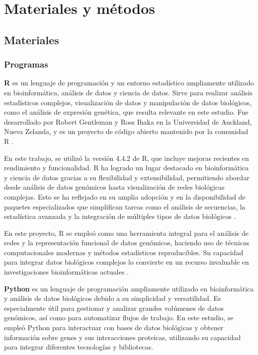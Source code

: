 \section{Materiales y métodos}


\subsection{\textbf{Materiales}}


\subsubsection{\textbf{Programas}}


\textbf{R} es un lenguaje de programación y un entorno estadístico ampliamente utilizado en bioinformática, análisis de datos y ciencia de datos. Sirve para realizar análisis estadísticos complejos, visualización de datos y manipulación de datos biológicos, como el análisis de expresión genética, que resulta relevante en este estudio. Fue desarrollado por Robert Gentleman y Ross Ihaka en la Universidad de Auckland, Nueva Zelanda, y es un proyecto de código abierto mantenido por la comunidad R \cite{jimenez2019introduccion}.


En este trabajo, se utilizó la versión 4.4.2 de R, que incluye mejoras recientes en rendimiento y funcionalidad. R ha logrado un lugar destacado en bioinformática y ciencia de datos gracias a su flexibilidad y extensibilidad, permitiendo abordar desde análisis de datos genómicos hasta visualización de redes biológicas complejas. Esto se ha reflejado en su amplia adopción y en la disponibilidad de paquetes especializados que simplifican tareas como el análisis de secuencias, la estadística avanzada y la integración de múltiples tipos de datos biológicos \cite{Giorgi2022}. 


En este proyecto, R se empleó como una herramienta integral para el análisis de redes y la representación funcional de datos genómicos, haciendo uso de técnicas computacionales modernas y métodos estadísticos reproducibles. Su capacidad para integrar datos biológicos complejos lo convierte en un recurso invaluable en investigaciones bioinformáticas actuales \cite{RLanguaje}.




\textbf{Python} es un lenguaje de programación ampliamente utilizado en bioinformática y análisis de datos biológicos debido a su simplicidad y versatilidad. Es especialmente útil para gestionar y analizar grandes volúmenes de datos genómicos, así como para automatizar flujos de trabajo. En este estudio, se empleó Python para interactuar con bases de datos biológicas y obtener información sobre genes y sus interacciones proteicas, utilizando su capacidad para integrar diferentes tecnologías y bibliotecas.

